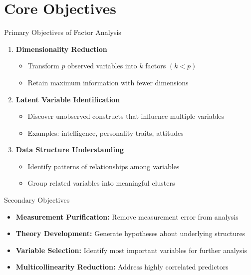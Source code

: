 \documentclass[aspectratio=169]{beamer}
\begin{document}
\section{Core Objectives}
\begin{frame}{Primary Objectives of Factor Analysis}
  \begin{enumerate}
    \item \textbf{Dimensionality Reduction}
    \begin{itemize}
      \item Transform $p$ observed variables into $k$ factors $(k < p)$
      \item Retain maximum information with fewer dimensions
    \end{itemize}
    
    \item \textbf{Latent Variable Identification}
    \begin{itemize}
      \item Discover unobserved constructs that influence multiple variables
      \item Examples: intelligence, personality traits, attitudes
    \end{itemize}
    
    \item \textbf{Data Structure Understanding}
    \begin{itemize}
      \item Identify patterns of relationships among variables
      \item Group related variables into meaningful clusters
    \end{itemize}
  \end{enumerate}
\end{frame}

\begin{frame}{Secondary Objectives}
  \begin{itemize}
    \item \textbf{Measurement Purification:} Remove measurement error from analysis
    \item \textbf{Theory Development:} Generate hypotheses about underlying structures
    \item \textbf{Variable Selection:} Identify most important variables for further analysis
    \item \textbf{Multicollinearity Reduction:} Address highly correlated predictors
  \end{itemize}
\end{frame}
\end{document}
